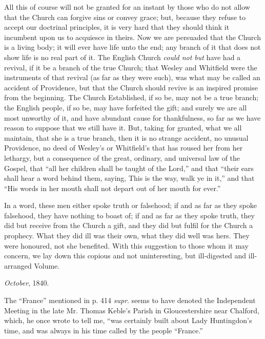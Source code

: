 All this of course will not be granted for an
instant by those who do not allow that the Church can forgive sins or
convey grace; but, because they refuse to accept our doctrinal
principles, it is very hard that they should think it incumbent upon
us to acquiesce in theirs. Now we are persuaded that the Church is a
living body; it will ever have life unto the end; any branch of it
that does not show life is no real part of it. The English Church \emph{could
not but} have had a revival, if it be a branch of the true Church;
that Wesley and Whitfield were the instruments of that revival (as far
as they were such), was what may be called an accident of Providence,
but that the Church should revive is an inspired promise from the
beginning. The Church Established, if so be, may not be a true branch;
the English people, if so be, may have forfeited the gift; and surely
we are all most unworthy of it, and have abundant cause for
thankfulness, so far as we have reason to suppose that we still have
it. But, taking for granted, what we all maintain, that she is a
true branch, then it is no strange accident, no unusual Providence, no
deed of Wesley's or Whitfield's that has roused her from her lethargy,
but a consequence of the great, ordinary, and universal law of the
Gospel, that ``all her children shall be taught of the Lord,'' and that ``their
ears shall hear a word behind them, saying, This is the way, walk ye
in it,'' and that ``His words in her mouth shall not depart out of her
mouth for ever.''

In a word, these men either spoke truth or
falsehood; if and as far as they spoke falsehood, they have nothing to
boast of; if and as far as they spoke truth, they did but receive from
the Church a gift, and they did but fulfil for the Church a prophecy.
What they did ill was their own, what they did well was hers. They
were honoured, not she benefited. With this suggestion to those whom
it may concern, we lay down this copious and not uninteresting, but
ill-digested and ill-arranged Volume.

\emph{October}, 1840.


The ``France'' mentioned in p. 414 \emph{supr}.
seems to have denoted the Independent Meeting in the late Mr. Thomas
Keble's Parish in Gloucestershire near Chalford, which, he once wrote
to tell me, ``was certainly built about Lady Huntingdon's time, and was
always in his time called by the people ``France.''
